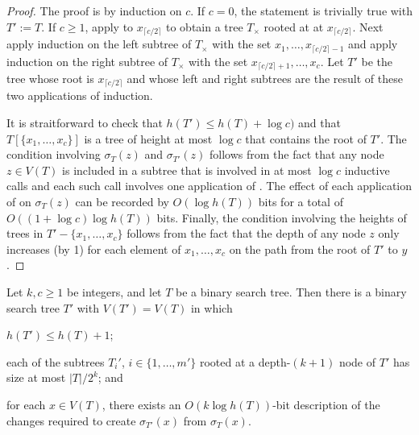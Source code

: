 \documentclass[kpfonts]{patmorin}
\begin{document}
\begin{proof}
  The proof is by induction on $c$.  If $c=0$, the statement is trivially true with $T':=T$.  If $c\ge 1$,  apply  to $x_{\lceil c/2\rceil}$ to obtain a tree $T_\times$ rooted at at $x_{\lceil c/2\rceil}$.  Next apply induction on the left subtree of $T_\times$ with the set $x_1,\ldots,x_{\lceil c/2\rceil -1}$ and apply induction on the right subtree of $T_\times$ with the set $x_{\lceil c/2\rceil +1},\ldots,x_c$.  Let $T'$ be the tree whose root is $x_{\lceil c/2\rceil}$ and whose left and right subtrees are the result of these two applications of induction.
  
  It is straitforward to check that $h(T')\le h(T)+\log c)$ and that $T[\{x_1,\ldots,x_c\}]$ is a tree of height at most $\log c$ that contains the root of $T'$.  The condition involving $\sigma_T(z)$ and $\sigma_{T'}(z)$ follows from the fact that any node $z\in V(T)$ is included in a subtree that is involved in at most $\log c$ inductive calls and each such call involves one application of .  The effect of each application of  on $\sigma_T(z)$ can be recorded by $O(\log h(T))$ bits for a total of $O((1+\log c)\log h(T))$ bits.  Finally, the condition involving the heights of trees in $T'-\{x_1,\ldots,x_c\}$ follows from the fact that the depth of any node $z$ only increases (by 1) for each element of $x_1,\ldots,x_c$ on the path from the root of $T'$ to $y$.
\end{proof}

\begin{lem}
  Let $k,c\ge 1$ be integers, and let $T$ be a binary search tree.  Then there is a binary search tree $T'$ with $V(T')=V(T)$ in which
  \begin{compactenum}
    \item $h(T')\le h(T)+1$; 

    \item  each of the subtrees $T_i'$, $i\in\{1,\ldots,m'\}$ rooted at a depth-$(k+1)$ node of $T'$ has size at most $|T|/2^k$; and
    
    \item for each $x\in V(T)$, there exists an $O(k\log h(T))$-bit description of the changes required to create $\sigma_{T'}(x)$ from $\sigma_T(x)$.
  \end{compactenum}
\end{lem}
\end{document}
